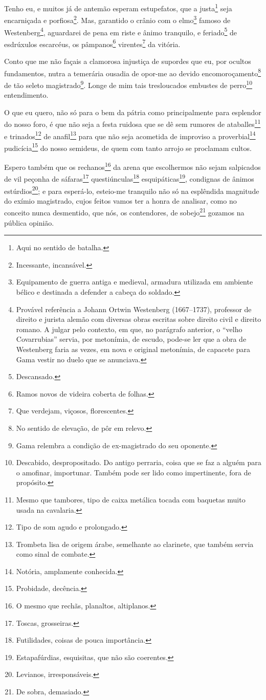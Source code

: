 Tenho eu, e muitos já de antemão esperam estupefatos, que a
justa\footnote{ Aqui no sentido de batalha.} seja encarniçada e
porfiosa\footnote{ Incessante, incansável.}. Mas, garantido o crânio
com o elmo\footnote{ Equipamento de guerra antiga e medieval, armadura
  utilizada em ambiente bélico e destinada a defender a cabeça do
  soldado.} famoso de Westenberg\footnote{ Provável referência a Johann
  Ortwin Westenberg (1667--1737), professor de direito e jurista alemão
  com diversas obras escritas sobre direito civil e direito romano. A
  julgar pelo contexto, em que, no parágrafo anterior, o ``velho
  Covarrubias'' servia, por metonímia, de escudo, pode-se ler que a obra
  de Westenberg faria as vezes, em nova e original metonímia, de
  capacete para Gama vestir no duelo que se anunciava.}, aguardarei de
pena em riste e ânimo tranquilo, e feriado\footnote{ Descansado.} de
esdrúxulos escarcéus, os pâmpanos\footnote{ Ramos novos de videira
  coberta de folhas.} virentes\footnote{ Que verdejam, viçosos,
  florescentes.} da vitória.

Conto que me não façais a clamorosa injustiça de supordes que eu, por
ocultos fundamentos, nutra a temerária ousadia de opor-me ao devido
encomoroçamento\footnote{ No sentido de elevação, de pôr em relevo.} de
tão seleto magistrado\footnote{ Gama relembra a condição de
  ex-magistrado do seu oponente.}. Longe de mim tais tresloucados
embustes de perro\footnote{ Descabido, despropositado. Do antigo
  perraria, coisa que se faz a alguém para o amofinar, importunar.
  Também pode ser lido como impertinente, fora de propósito.}
entendimento.

O que eu quero, não só para o bem da pátria como principalmente para
esplendor do nosso foro, é que não seja a festa ruidosa que se dê sem
rumores de ataballes\footnote{ Mesmo que tambores, tipo de caixa
  metálica tocada com baquetas muito usada na cavalaria.} e
trinados\footnote{ Tipo de som agudo e prolongado.} de
anafil\footnote{ Trombeta lisa de origem árabe, semelhante ao
  clarinete, que também servia como sinal de combate.} para que não seja
acometida de improviso a proverbial\footnote{ Notória, amplamente
  conhecida.} pudicícia\footnote{ Probidade, decência.} do nosso
semideus, de quem com tanto arrojo se proclamam cultos.

Espero também que os rechanos\footnote{ O mesmo que rechãs, planaltos,
  altiplanos.} da arena que escolhermos não sejam salpicados de vil
peçonha de sáfaras\footnote{ Toscas, grosseiras.}
questiúnculas\footnote{ Futilidades, coisas de pouca importância.}
esquipáticas\footnote{ Estapafúrdias, esquisitas, que não são
  coerentes.}, condignas de ânimos estúrdios\footnote{ Levianos,
  irresponsáveis.}; e para esperá-lo, esteio-me tranquilo não só na
esplêndida magnitude do exímio magistrado, cujos feitos vamos ter a
honra de analisar, como no conceito nunca desmentido, que nós, os
contendores, de sobejo\footnote{ De sobra, demasiado.} gozamos na
pública opinião.

